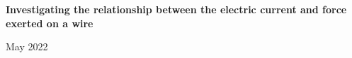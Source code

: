 \documentclass[11pt]{article}
\begin{document}
	\begin{center}
		\textbf{\Large Investigating the relationship between the electric current and force exerted on a wire}

		\vspace*{8pt}

		May 2022
	\end{center}

    

	

	

	

	

	

	\newpage

	\printbibliography[
		heading=bibintoc,
		title={Bibliography}
	]
\end{document}

